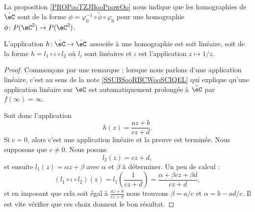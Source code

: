 \begin{normaltext}      \label{NORMooCVYKooYvjIeE}
    La proposition \ref{PROPooTZJBooPpowOo} nous indique que les homographies de \( \hat \eC\) sont de la forme \( \phi=\varphi_0^{-1}\circ\tilde \phi\circ\varphi_0\) pour une homographie \( \phi\colon P(\eC^2)\to P(\eC^2)\).
\end{normaltext}

\begin{proposition}      \label{PROPooSQFOooRginjJ}
    L'application \( h\colon \hat\eC\to \hat \eC\) associée à une homographie est soit linéaire, soit de la forme \( h=l_1\circ \iota\circ l_2\) où \( l_i\) sont linéaires et \( \iota\) est l'application \( z\mapsto 1/z\).
\end{proposition}

\begin{proof}
    Commençons par une remarque : lorsque nous parlons d'une application linéaire, c'est au sens de la note \ref{SSUBSooRBCWooSCIQEL} qui explique qu'une application linéaire sur \( \eC\) est automatiquement prolongée à \( \hat \eC\) par \( f(\infty)=\infty\).

    Soit donc l'application 
    \begin{equation}
        h(z)=\frac{ az+b }{ cz+d }.
    \end{equation}
    Si \( c=0\), alors c'est une application linéaire et la preuve est terminée. Nous supposons que \( c\neq 0\). Nous posons
    \begin{equation}
        l_2(z)=cz+d,
    \end{equation}
    et ensuite \( l_1(z)=\alpha z+\beta\) avec \( \alpha\) et \( \beta\) à déterminer. Un peu de calcul :
    \begin{equation}
        (l_1\circ \iota\circ l_2)(z)=l_1\left( \frac{1}{ cz+d } \right)=\frac{ \alpha+\beta c z+\beta d }{ cz+d },
    \end{equation}
    et en imposant que cela soit égal à \( \frac{ az+b }{ cz+d }\) nous trouvons \( \beta=a/c\) et \( \alpha=b-ad/c\). Il est vite vérifier que ces choix donnent le bon résultat.
\end{proof}

